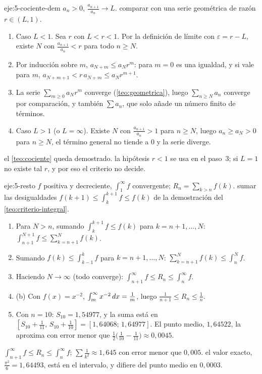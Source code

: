 \begin{solucion}{eje:5-cociente-dem}
\datos $a_n>0$, $\frac{a_{n+1}}{a_n}\to L$.
\planteamiento comparar con una serie geométrica de razón $r\in(L,1)$.
\pasos
\begin{enumerate}[label=\arabic*.]
  \item Caso $L<1$. Sea $r$ con $L<r<1$. Por la definición de límite con $\varepsilon=r-L$, existe $N$ con $\frac{a_{n+1}}{a_n}<r$ para todo $n\ge N$.
  \item Por inducción sobre $m$, $a_{N+m}\le a_Nr^{m}$: para $m=0$ es una igualdad, y si vale para $m$, $a_{N+m+1}<r\,a_{N+m}\le a_Nr^{m+1}$.
  \item La serie $\sum_{m\ge0}a_Nr^{m}$ converge (\cref{teo:geometrica}), luego $\sum_{n\ge N}a_n$ converge por comparación, y también $\sum a_n$, que solo añade un número finito de términos.
  \item Caso $L>1$ (o $L=\infty$). Existe $N$ con $\frac{a_{n+1}}{a_n}>1$ para $n\ge N$, luego $a_n\ge a_N>0$ para $n\ge N$, el término general no tiende a $0$ y la serie diverge.
\end{enumerate}
\resultado el \cref{teo:cociente} queda demostrado.
\comprobacion la hipótesis $r<1$ se usa en el paso~3; si $L=1$ no existe tal $r$, y por eso el criterio no decide.
\end{solucion}

\begin{solucion}{eje:5-resto}
\datos $f$ positiva y decreciente, $\int_1^{\infty}f$ convergente; $R_n=\sum_{k>n}f(k)$.
\planteamiento sumar las desigualdades $f(k+1)\le\int_k^{k+1}f\le f(k)$ de la demostración del \cref{teo:criterio-integral}.
\pasos
\begin{enumerate}[label=\arabic*.]
  \item Para $N>n$, sumando $\int_k^{k+1}f\le f(k)$ para $k=n+1,\dots,N$: $\int_{n+1}^{N+1}f\le\sum_{k=n+1}^{N}f(k)$.
  \item Sumando $f(k)\le\int_{k-1}^{k}f$ para $k=n+1,\dots,N$: $\sum_{k=n+1}^{N}f(k)\le\int_n^{N}f$.
  \item Haciendo $N\to\infty$ (todo converge): $\int_{n+1}^{\infty}f\le R_n\le\int_n^{\infty}f$.
  \item (b) Con $f(x)=x^{-2}$, $\int_m^{\infty}x^{-2}\mathop{}\!d x=\frac1m$, luego $\frac{1}{n+1}\le R_n\le\frac1n$.
  \item Con $n=10$: $S_{10}=1{,}54977$, y la suma está en $[S_{10}+\frac{1}{11},\,S_{10}+\frac{1}{10}]=[1{,}64068;\,1{,}64977]$. El punto medio, $1{,}64522$, la aproxima con error menor que $\frac12\bigl(\frac1{10}-\frac1{11}\bigr)\approx0{,}0045$.
\end{enumerate}
\resultado $\int_{n+1}^{\infty}f\le R_n\le\int_n^{\infty}f$; $\sum\frac{1}{k^{2}}\approx1{,}645$ con error menor que $0{,}005$.
\comprobacion el valor exacto, $\frac{\pi^{2}}{6}=1{,}64493$, está en el intervalo, y difiere del punto medio en $0{,}0003$.
\end{solucion}

